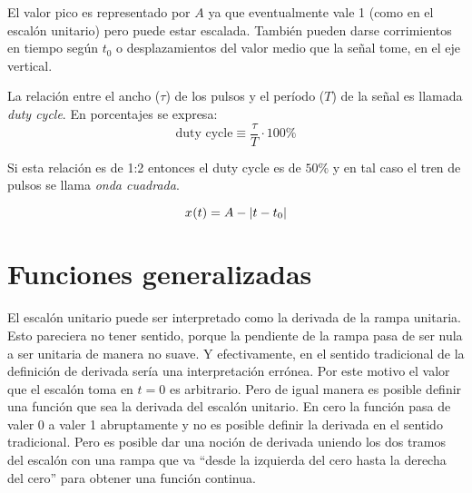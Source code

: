 El valor pico es representado por $A$ ya que eventualmente vale 1 (como en el escalón unitario) pero puede estar escalada.
También pueden darse corrimientos en tiempo según $t_0$ o desplazamientos del valor medio que la señal tome, en el eje vertical.

La relación entre el ancho ($\tau$) de los pulsos y el período ($T$) de la señal es llamada \emph{duty cycle}.
En porcentajes se expresa:
\begin{equation*}
    \text{duty cycle}  \equiv \frac{\tau}{T} \cdot 100\%
\end{equation*}

Si esta relación es de 1:2 entonces el duty cycle es de $50\%$ y en tal caso el tren de pulsos se llama \emph{onda cuadrada}.


\begin{equation*}
    \fx[x]{t} = A - \norm{t-t_0}
\end{equation*}

\begin{center}
    \def\svgwidth{0.8\linewidth}
    
\end{center}


\section{Funciones generalizadas}

El escalón unitario puede ser interpretado como la derivada de la rampa unitaria.
Esto pareciera no tener sentido, porque la pendiente de la rampa pasa de ser nula a ser unitaria de manera no suave.
Y efectivamente, en el sentido tradicional de la definición de derivada sería una interpretación errónea.
Por este motivo el valor que el escalón toma en $t=0$ es arbitrario.
Pero de igual manera es posible definir una función que sea la derivada del escalón unitario.
En cero la función pasa de valer 0 a valer 1 abruptamente y no es posible definir la derivada en el sentido tradicional.
Pero es posible dar una noción de derivada uniendo los dos tramos del escalón con una rampa que va ``desde la izquierda del cero hasta la derecha del cero'' para obtener una función continua.

\begin{center}
    \def\svgwidth{0.6\linewidth}
    
\end{center}

